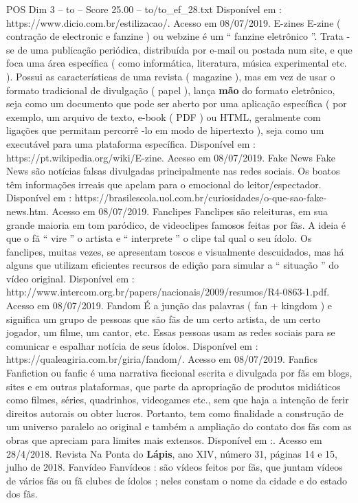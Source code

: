 \begin{textsample}{POS Dim 3 – to – Score 25.00 – to/to\_ef\_28.txt}
Disponível em : https://www.dicio.com.br/estilizacao/.
Acesso em 08/07/2019.
E-zines E-zine ( contração de electronic e fanzine ) ou webzine é um “ fanzine eletrônico ”.
Trata -se de uma publicação periódica, distribuída por e-mail ou postada num site, e que foca uma área específica ( como informática, literatura, música experimental etc. ).
Possui as características de uma revista ( magazine ), mas em vez de usar o formato tradicional de divulgação ( papel ), lança \textbf{mão} do formato eletrônico, seja como um documento que pode ser aberto por uma aplicação específica ( por exemplo, um arquivo de texto, e-book ( PDF ) ou HTML, geralmente com ligações que permitam percorrê -lo em modo de hipertexto ), seja como um executável para uma plataforma específica.
Disponível em : https://pt.wikipedia.org/wiki/E-zine.
Acesso em 08/07/2019.
Fake News Fake News são notícias falsas divulgadas principalmente nas redes sociais.
Os boatos têm informações irreais que apelam para o emocional do leitor/espectador.
Disponível em : https://brasilescola.uol.com.br/curiosidades/o-que-sao-fake-news.htm.
Acesso em 08/07/2019.
Fanclipes Fanclipes são releituras, em sua grande maioria em tom paródico, de videoclipes famosos feitas por fãs.
A ideia é que o fã “ vire ” o artista e “ interprete ” o clipe tal qual o seu ídolo.
Os fanclipes, muitas vezes, se apresentam toscos e visualmente descuidados, mas há alguns que utilizam eficientes recursos de edição para simular a “ situação ” do vídeo original.
Disponível em : http://www.intercom.org.br/papers/nacionais/2009/resumos/R4-0863-1.pdf.
Acesso em 08/07/2019.
Fandom É a junção das palavras ( fan + kingdom ) e significa um grupo de pessoas que são fãs de um certo artista, de um certo jogador, um filme, um cantor, etc.
Essas pessoas usam as redes sociais para se comunicar e espalhar notícia de seus ídolos.
Disponível em : https://qualeagiria.com.br/giria/fandom/.
Acesso em 08/07/2019.
Fanfics Fanfiction ou fanfic é uma narrativa ficcional escrita e divulgada por fãs em blogs, sites e em outras plataformas, que parte da apropriação de produtos midiáticos como filmes, séries, quadrinhos, videogames etc., sem que haja a intenção de ferir direitos autorais ou obter lucros.
Portanto, tem como finalidade a construção de um universo paralelo ao original e também a ampliação do contato dos fãs com as obras que apreciam para limites mais extensos.
Disponível em :.
Acesso em 28/4/2018.
Revista Na Ponta do \textbf{Lápis}, ano XIV, número 31, páginas 14 e 15, julho de 2018.
Fanvídeo Fanvídeos : são vídeos feitos por fãs, que juntam vídeos de vários fãs ou fã clubes de ídolos ; neles constam o nome da cidade e do estado dos fãs.

\end{textsample}
